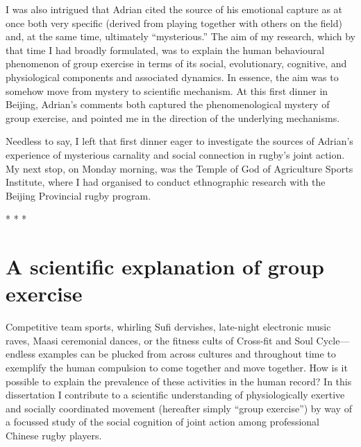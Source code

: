 \begin{CJK}{UTF8}{gbsn}
I was also intrigued that Adrian cited the source of his emotional capture as at once both very specific (derived from playing together with others on the field) and, at the same time, ultimately ``mysterious.''  The aim of my research, which by that time I had broadly formulated, was to explain the human behavioural phenomenon of group exercise in terms of its social, evolutionary, cognitive, and physiological components and associated dynamics.  In essence, the aim was to somehow move from mystery to scientific mechanism.  At this first dinner in Beijing, Adrian's comments both captured the phenomenological mystery of group exercise, and pointed me in the direction of the underlying mechanisms.

Needless to say, I left that first dinner eager to investigate the sources of Adrian's experience of mysterious carnality and social connection in rugby's joint action.  My next stop, on Monday morning, was the Temple of God of Agriculture Sports Institute, where I had organised to conduct ethnographic research with the Beijing Provincial rugby program.


                            \begin{center}
                              * * *
                            \end{center}



\section{A scientific explanation of group exercise}
Competitive team sports, whirling Sufi dervishes, late-night electronic music raves, Maasi ceremonial dances, or the fitness cults of Cross-fit and Soul Cycle---endless examples can be plucked from across cultures and throughout time to exemplify the human compulsion to come together and move together.  How is it possible to explain the prevalence of these activities in the human record?  In this dissertation I contribute to a scientific understanding of physiologically exertive and socially coordinated movement (hereafter simply ``group exercise'') by way of a focussed study of the social cognition of joint action among professional Chinese rugby players.



\end{CJK}
